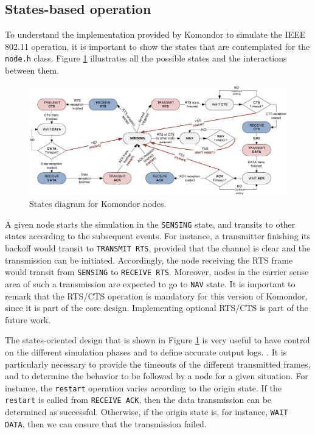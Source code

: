\documentclass[a4paper]{article}
\begin{document}
\subsection{States-based operation}
\label{section:states}
To understand the implementation provided by Komondor to simulate the IEEE 802.11 operation, it is important to show the states that are contemplated for the \texttt{node.h} class. Figure \ref{fig:state_diagram} illustrates all the possible states and the interactions between them.

\begin{figure}[h]
	\centering
	\includegraphics[width=\textwidth]{images/state_diagram.eps}
	\caption{States diagram for Komondor nodes.}    
	\label{fig:state_diagram}
\end{figure}

A given node starts the simulation in the \texttt{SENSING} state, and transits to other states according to the subsequent events. For instance, a transmitter finishing its backoff would transit to \texttt{TRANSMIT RTS}, provided that the channel is clear and the transmission can be initiated. Accordingly, the node receiving the RTS frame would transit from \texttt{SENSING} to \texttt{RECEIVE RTS}. Moreover, nodes in the carrier sense area of such a transmission are expected to go to \texttt{NAV} state. It is important to remark that the RTS/CTS operation is mandatory for this version of Komondor, since it is part of the core design. Implementing optional RTS/CTS is part of the future work.

The states-oriented design that is shown in Figure \ref{fig:state_diagram} is very useful to have control on the different simulation phases and to define accurate output logs. . It is particularly necessary to provide the timeouts of the different transmitted frames, and to determine the behavior to be followed by a node for a given situation. For instance, the \texttt{restart} operation varies according to the origin state. If the \texttt{restart} is called from \texttt{RECEIVE ACK}, then the data transmission can be determined as successful. Otherwise, if the origin state is, for instance, \texttt{WAIT DATA}, then we can ensure that the transmission failed.
\end{document}
